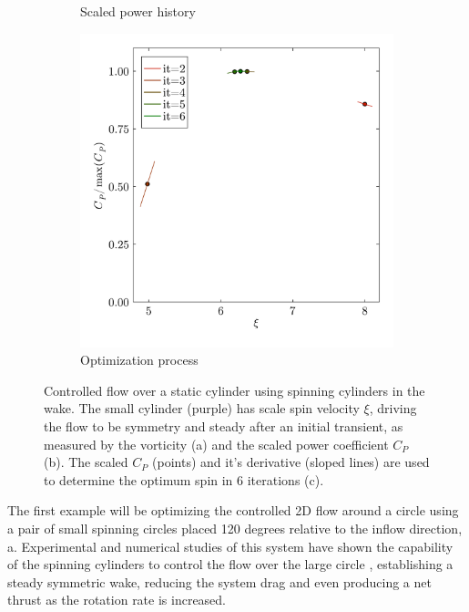 \documentclass[10pt,a4paper]{article}
\begin{document}
\begin{figure}
\begin{subfigure}[b]{0.38\linewidth}
        \vspace{-1cm}
        \caption{Scaled power history}
    \end{subfigure}\hspace{20pt}
    \begin{subfigure}[b]{0.38\linewidth}
        \centering
        \includegraphics[width=\linewidth]{img/SpinOptim.pdf}
        \vspace{-1cm}
        \caption{Optimization process}
    \end{subfigure}
    \caption{Controlled flow over a static cylinder using spinning cylinders in the wake. The small cylinder (purple) has scale spin velocity $\xi$, driving the flow to be symmetry and steady after an initial transient, as measured by the vorticity (a) and the scaled power coefficient $C_P$ (b). The scaled $C_P$ (points) and it's derivative (sloped lines) are used to determine the optimum spin in 6 iterations (c).}
    \label{fig:spinning_circle}
\end{figure}

The first example will be optimizing the controlled 2D flow around a circle using a pair of small spinning circles placed 120 degrees relative to the inflow direction, a. Experimental and numerical studies of this system have shown the capability of the spinning cylinders to control the flow over the large circle \cite{Schulmeister2017}, establishing a steady symmetric wake, reducing the system drag and even producing a net thrust as the rotation rate is increased.
\end{document}
